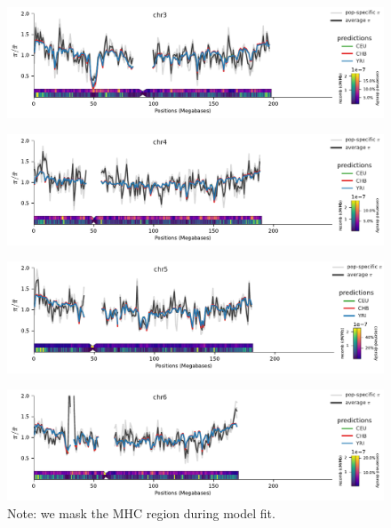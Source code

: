 \documentclass[11pt]{article}
\begin{document}
\begin{figure}[!htb]
  \centering
  \includegraphics[width=\textwidth]{figures/supplementary/pred_plot_chr3.pdf}
  \label{suppfig:fit-chr3}
\end{figure}


\begin{figure}[!htb]
  \centering
  \includegraphics[width=\textwidth]{figures/supplementary/pred_plot_chr4.pdf}
  \label{suppfig:fit-chr4}
\end{figure}


\begin{figure}[!htb]
  \centering
  \includegraphics[width=\textwidth]{figures/supplementary/pred_plot_chr5.pdf}
  \label{suppfig:fit-chr5}
\end{figure}


\begin{figure}[!htb]
  \centering
  \includegraphics[width=\textwidth]{figures/supplementary/pred_plot_chr6.pdf}
  \caption{Note: we mask the MHC region during model fit.}
  \label{suppfig:fit-chr6}
\end{figure}
\end{document}
